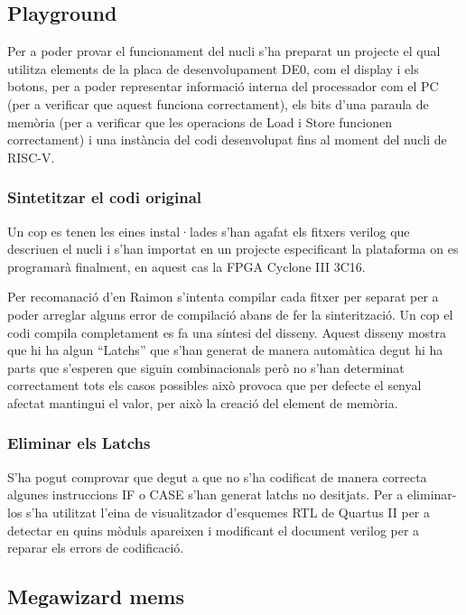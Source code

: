 \documentclass[conference,onecolumn, catalan]{IEEEtran}
\begin{document}
\subsection{Playground}

Per a poder provar el funcionament del nucli s'ha preparat un projecte el qual utilitza elements de la placa de desenvolupament DE0, com el display i els botons, per a poder representar informació interna del processador com el PC (per a verificar que aquest funciona correctament), els bits d'una paraula de memòria (per a verificar que les operacions de Load i Store funcionen correctament) i una instància del codi desenvolupat fins al moment del nucli de RISC-V.


\subsubsection{Sintetitzar el codi original }

Un cop es tenen les eines instal·lades s'han agafat els fitxers verilog que descriuen el nucli i s'han importat en un projecte especificant la plataforma on es programarà finalment, en aquest cas la FPGA Cyclone III 3C16. 

Per recomanació d'en Raimon s'intenta compilar cada fitxer per separat per a poder arreglar alguns error de compilació abans de fer la sinterització. Un cop el codi compila completament es fa una síntesi del disseny. Aquest disseny mostra que hi ha algun ``Latchs'' que s'han generat de manera automàtica degut hi ha parts que s'esperen que siguin combinacionals però no s'han determinat correctament tots els casos possibles això provoca que per defecte el senyal afectat mantingui el valor, per això la creació del element de memòria. 

\subsubsection{Eliminar els Latchs }

S'ha pogut comprovar que degut a que no s'ha codificat de manera correcta algunes instruccions IF o CASE s'han generat latchs no desitjats. Per a eliminar-los s'ha utilitzat l'eina de visualitzador d'esquemes RTL de Quartus II per a detectar en quins mòduls apareixen i modificant el document verilog per a reparar els errors de codificació. 


\subsection{Megawizard mems}
\end{document}
